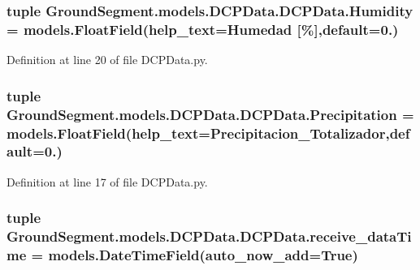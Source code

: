 \subsubsection[{Humidity}]{\setlength{\rightskip}{0pt plus 5cm}tuple Ground\+Segment.\+models.\+D\+C\+P\+Data.\+D\+C\+P\+Data.\+Humidity = models.\+Float\+Field(help\+\_\+text=\textquotesingle{}Humedad \mbox{[}\%\mbox{]}\textquotesingle{},default=0.)\hspace{0.3cm}{\ttfamily [static]}}\label{class_ground_segment_1_1models_1_1_d_c_p_data_1_1_d_c_p_data_abd1efe8c1bc0b27d851986745739895d}


Definition at line 20 of file D\+C\+P\+Data.\+py.

\hypertarget{class_ground_segment_1_1models_1_1_d_c_p_data_1_1_d_c_p_data_aba6958f5451f5d205ecae7c0f2847e23}{}
\subsubsection[{Precipitation}]{\setlength{\rightskip}{0pt plus 5cm}tuple Ground\+Segment.\+models.\+D\+C\+P\+Data.\+D\+C\+P\+Data.\+Precipitation = models.\+Float\+Field(help\+\_\+text=\textquotesingle{}Precipitacion\+\_\+\+Totalizador\textquotesingle{},default=0.)\hspace{0.3cm}{\ttfamily [static]}}\label{class_ground_segment_1_1models_1_1_d_c_p_data_1_1_d_c_p_data_aba6958f5451f5d205ecae7c0f2847e23}


Definition at line 17 of file D\+C\+P\+Data.\+py.

\hypertarget{class_ground_segment_1_1models_1_1_d_c_p_data_1_1_d_c_p_data_af6a317c57d56f2baa06974573482ce00}{}
\subsubsection[{receive\+\_\+data\+Time}]{\setlength{\rightskip}{0pt plus 5cm}tuple Ground\+Segment.\+models.\+D\+C\+P\+Data.\+D\+C\+P\+Data.\+receive\+\_\+data\+Time = models.\+Date\+Time\+Field(auto\+\_\+now\+\_\+add=True)\hspace{0.3cm}{\ttfamily [static]}}\label{class_ground_segment_1_1models_1_1_d_c_p_data_1_1_d_c_p_data_af6a317c57d56f2baa06974573482ce00}


